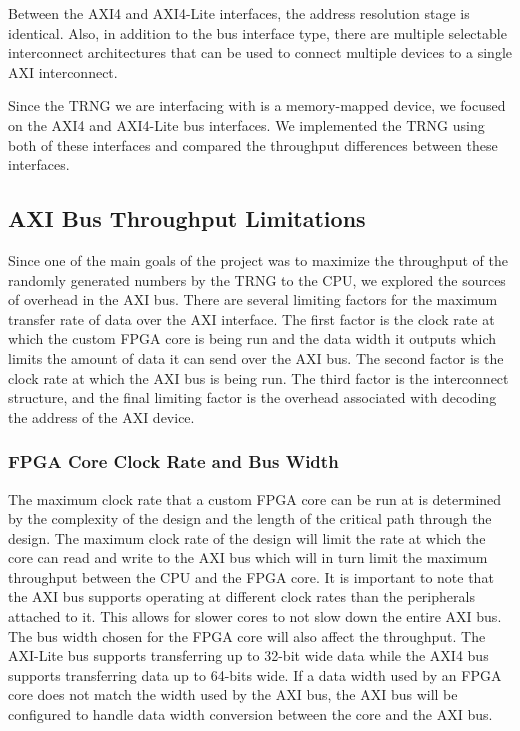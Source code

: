 \documentclass[journal]{IEEEtran}
\begin{document}
Between the AXI4 and AXI4-Lite interfaces, the address resolution stage is identical. Also, in addition to the bus interface type, there are multiple selectable interconnect architectures that can be used to connect multiple devices to a single AXI interconnect. 

Since the TRNG we are interfacing with is a memory-mapped device, we focused on the AXI4 and AXI4-Lite bus interfaces. We implemented the TRNG using both of these interfaces and compared the throughput differences between these interfaces. 


\subsection{AXI Bus Throughput Limitations}

Since one of the main goals of the project was to maximize the throughput of the randomly generated numbers by the TRNG to the CPU, we explored the sources of overhead in the AXI bus. There are several limiting factors for the maximum transfer rate of data over the AXI interface. The first factor is the clock rate at which the custom FPGA core is being run and the data width it outputs which limits the amount of data it can send over the AXI bus. The second factor is the clock rate at which the AXI bus is being run. The third factor is the interconnect structure, and the final limiting factor is the overhead associated with decoding the address of the AXI device. \\


\subsubsection{FPGA Core Clock Rate and Bus Width}
The maximum clock rate that a custom FPGA core can be run at is determined by the complexity of the design and the length of the critical path through the design. The maximum clock rate of the design will limit the rate at which the core can read and write to the AXI bus which will in turn limit the maximum throughput between the CPU and the FPGA core. It is important to note that the AXI bus supports operating at different clock rates than the peripherals attached to it. This allows for slower cores to not slow down the entire AXI bus. The bus width chosen for the FPGA core will also affect the throughput. The AXI-Lite bus supports transferring up to 32-bit wide data while the AXI4 bus supports transferring data up to 64-bits wide. If a data width used by an FPGA core does not match the width used by the AXI bus, the AXI bus will be configured to handle data width conversion between the core and the AXI bus. \cite{AXI_Reference_Guide} \\
\end{document}
